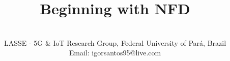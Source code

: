 \documentclass[11pt,conference]{./IEEEtran}
\newcommand{\mytitle}{Beginning with NFD}
\begin{document}
 

\title{\mytitle}

                               
\author{
 \\
 LASSE - 5G & IoT Research Group, Federal University of Par\'{a}, Brazil\\
Email: igorsantos95@live.com
}


\maketitle
\end{document}
